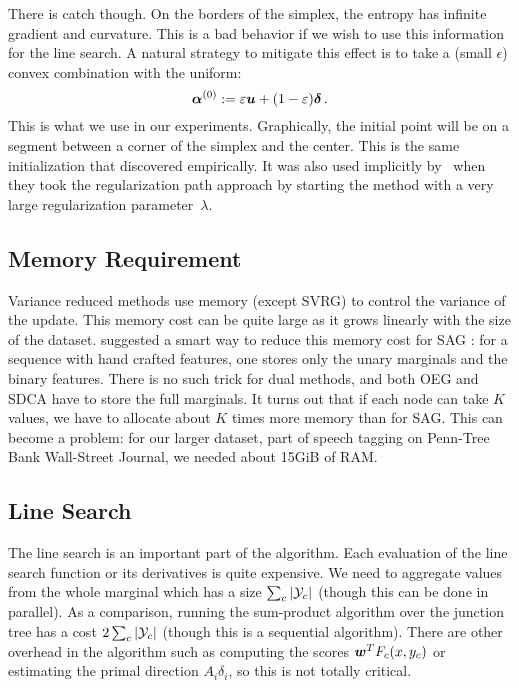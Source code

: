 \begin{subappendices}
There is catch though. On the borders of the simplex, the entropy has infinite gradient and curvature.
This is a bad behavior if we wish to use this information for the line search.
A natural strategy to mitigate this effect is to take a (small $\epsilon$) convex combination with the uniform:
\begin{equation} \label{eq:initialization:app}
	\boldsymbol{\alpha}^{(0)} := \varepsilon \bm u + (1-\varepsilon) \bm\delta \, .
\end{equation}
This is what we use in our experiments.
Graphically, the initial point will be on a segment between a corner of the simplex and the center.
This is the same initialization that \citet[App.~D of the Sup.~Mat.]{schmidt2015non} discovered empirically. It was also used implicitly by~\citet{collins2008exponentiated} when they took the regularization path approach by starting the method with a very large regularization parameter~$\lambda$.

\subsection{Memory Requirement}

Variance reduced methods use memory (except SVRG) to control the variance of the update.
This memory cost can be quite large as it grows linearly with the size of the dataset.
\citet{schmidt2015non} suggested a smart way to reduce this memory cost for  SAG : for a sequence with hand crafted features, one stores only the unary marginals and the binary features.
There is no such trick for dual methods, and both OEG and SDCA have to store the full marginals.
It turns out that if each node can take $K$ values, we have to allocate about $K$ times more memory than for SAG.
This can become a problem: for our larger dataset, part of speech tagging on Penn-Tree Bank Wall-Street Journal, we needed about 15GiB of RAM.

\subsection{Line Search} \label{app:sec:implementation line search}
The line search is an important part of the algorithm.
Each evaluation of the line search function or its derivatives is quite expensive.
We need to aggregate values from the whole marginal which has a size $\sum_c | {\mathcal Y}_c |$ (though this can be done in parallel).
As a comparison, running the sum-product algorithm over the junction tree has a cost $2\sum_c | {\mathcal Y}_c |$ (though this is a sequential algorithm).
There are other overhead in the algorithm such as computing the scores $\boldsymbol{w}^T F_c(x, y_c)$ or estimating the primal direction $A_i \delta_i$, so this is not totally critical.


\end{subappendices}
